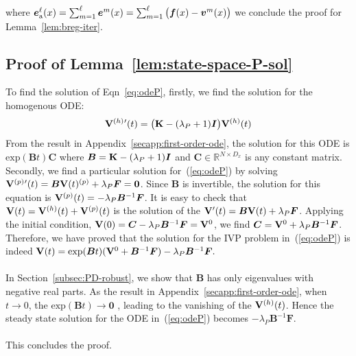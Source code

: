 where $\bm{e}^{\ell}_{\mathrm{a}}(x)= \sum_{m = 1}^{\ell} \bm{e}^m(x) = \sum_{m = 1}^{\ell}\big( {\bm f}(x) - {\bm v}^m(x) \big)$
we conclude the proof for Lemma~\ref{lem:breg-iter}.
\subsection{Proof of Lemma~\ref{lem:state-space-P-sol}}
\label{secapp:state-space-P-sol}
To find the solution of Eqn~\ref{eq:odeP}, firstly, we find the solution for the homogenous ODE:
\begin{align}
    {\mathbf V}^{(h)}{'}(t) = \bigl({\mathbf K} - (\lambda_P + 1)\bm{I} \bigl){\mathbf V}^{(h)}(t)
\end{align}
From the result in Appendix~\ref{secapp:first-order-ode}, the solution for this ODE is $\mathrm{exp}(\bm{B}t)\bm{C}$ where $\bm{B} = {\mathbf K} - (\lambda_P + 1)\bm{I}$ and $\bm{C} \in \mathbb{R}^{N \times D_x} $ is any constant matrix.
Secondly, we find a particular solution for~(\ref{eq:odeP}) by solving ${\mathbf V}^{(p)}{'}(t) = \bm{B}{\mathbf V}(t)^{(p)} + \lambda_P\bm{F} = \bm{0}$. Since $\bm{B}$ is invertible, the solution for this equation is ${\mathbf V}^{(p)}(t) = -\lambda_P\bm{B}^{-1}\bm{F}$. It is easy to check that ${\mathbf V}(t) = {\mathbf V}^{(h)}(t) + {\mathbf V}^{(p)}(t)$ is the solution of the ${\mathbf V}'(t) = \bm{B}{\mathbf V}(t) + \lambda_P\bm{F}$. Applying the initial condition, ${\mathbf V}(0) = \bm{C} -\lambda_P\bm{B}^{-1}\bm{F} = {\mathbf V}^0$, we find $\bm{C} = {\mathbf V}^0 + \lambda_P\bm{B}^{-1}\bm{F}$. Therefore, we have proved that the solution for the IVP problem in~(\ref{eq:odeP}) is indeed ${\mathbf V}(t) = \mathrm{exp}(\bm{B}t)({\mathbf V}^0 + \bm{B}^{-1}\bm{F}) - \lambda_P\bm{B}^{-1}\bm{F}.$\\ \\
In Section~\ref{subsec:PD-robust}, we show that $\bm{B}$ has only eigenvalues with negative real parts. As the result in Appendix~\ref{secapp:first-order-ode}, when $t \rightarrow 0$, the $\mathrm{exp}(\bm{B}t) \rightarrow \bm{0}$ , leading to the vanishing of the ${\mathbf V}^{(h)}(t)$. Hence the steady state solution for the ODE in~(\ref{eq:odeP}) becomes $ - \lambda_P\bm{B}^{-1}\bm{F}$.
\\ \\
This concludes the proof.

